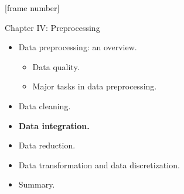 \documentclass[aspectratio=169,t]{beamer}
\begin{document}
  {
    [frame number]
    \begin{frame}{Chapter IV: Preprocessing}
        \begin{itemize}
            \item Data preprocessing: an overview.
            \begin{itemize}
              \item Data quality.
              \item Major tasks in data preprocessing.
            \end{itemize}
            \item Data cleaning.
            \item \textbf{Data integration.}
            \item Data reduction.
            \item Data transformation and data discretization.
            \item Summary.
        \end{itemize}
    \end{frame}
  }
\end{document}
